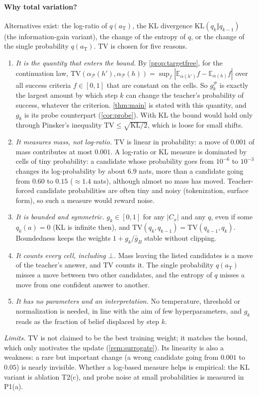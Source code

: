 \documentclass[11pt]{article}
\theoremstyle{definition}
\theoremstyle{remark}
\newcommand{\aT}{a_{\mathrm{T}}}
\newcommand{\KL}{\mathrm{KL}}
\newcommand{\TV}{\mathrm{TV}}
\newcommand{\E}{\mathbb{E}}
\newcommand{\other}{\bot}
\begin{document}
\paragraph{Why total variation?}
\label{sec:whytv}
Alternatives exist: the log-ratio of $q(\aT)$, the KL divergence $\KL(q_k\Vert q_{k-1})$ (the information-gain variant), the change of the entropy of $q$, or the change of the single probability $q(\aT)$. $\TV$ is chosen for five reasons.
\begin{enumerate}[itemsep=1pt,topsep=2pt]
\item \emph{It is the quantity that enters the bound.} By \cref{prop:targetfree}, for the continuation law, $\TV(\alpha_{\mathcal P}(h'),\alpha_{\mathcal P}(h))=\sup_f|\E_{\alpha(h')}f-\E_{\alpha(h)}f|$ over all success criteria $f\in[0,1]$ that are constant on the cells. So $g^{\mathcal P}_k$ is exactly the largest amount by which step $k$ can change the teacher's probability of success, whatever the criterion. \cref{thm:main} is stated with this quantity, and $g_k$ is its probe counterpart (\cref{cor:probe}). With KL the bound would hold only through Pinsker's inequality $\TV\le\sqrt{\KL/2}$, which is loose for small shifts.
\item \emph{It measures mass, not log-ratio.} $\TV$ is linear in probability: a move of $0.001$ of mass contributes at most $0.001$. A log-ratio or KL measure is dominated by cells of tiny probability: a candidate whose probability goes from $10^{-6}$ to $10^{-3}$ changes its log-probability by about $6.9$ nats, more than a candidate going from $0.60$ to $0.15$ ($\approx1.4$ nats), although almost no mass has moved. Teacher-forced candidate probabilities are often tiny and noisy (tokenization, surface form), so such a measure would reward noise.
\item \emph{It is bounded and symmetric.} $g_k\in[0,1]$ for any $|C_x|$ and any $q$, even if some $q_k(a)=0$ (KL is infinite then), and $\TV(q_k,q_{k-1})=\TV(q_{k-1},q_k)$. Boundedness keeps the weights $1+g_k/\bar g_B$ stable without clipping.
\item \emph{It counts every cell, including $\other$.} Mass leaving the listed candidates is a move of the teacher's answer, and $\TV$ counts it. The single probability $q(\aT)$ misses a move between two other candidates, and the entropy of $q$ misses a move from one confident answer to another.
\item \emph{It has no parameters and an interpretation.} No temperature, threshold or normalization is needed, in line with the aim of few hyperparameters, and $g_k$ reads as the fraction of belief displaced by step $k$.
\end{enumerate}
\emph{Limits.} $\TV$ is not claimed to be the best training weight; it matches the bound, which only motivates the update (\cref{rem:surrogate}). Its linearity is also a weakness: a rare but important change (a wrong candidate going from $0.001$ to $0.05$) is nearly invisible. Whether a log-based measure helps is empirical: the KL variant is ablation T2(c), and probe noise at small probabilities is measured in P1(a).
\end{document}
